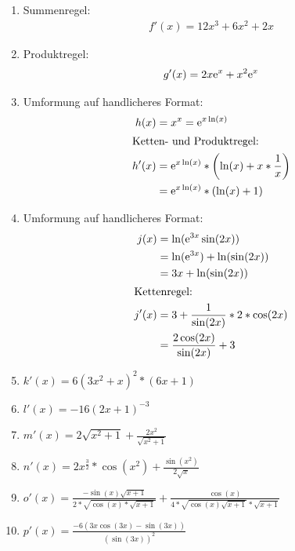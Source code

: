 \begin{lsg}{}
	\begin{multicols}{2}
		\begin{enumerate}
			\item Summenregel: \begin{align*}
			f'(x)=12x^3+6x^2+2x
			\end{align*}
			\item Produktregel: \begin{align*}
			g'(x)=2x\mathrm{e}^x+x^2\mathrm{e}^x
			\end{align*}
			\item Umformung auf handlicheres Format: \begin{align*}
		    h(x)&= x^x= \mathrm{e}^{x\ln(x)}\\
		    \intertext{Ketten- und Produktregel: }
				h'(x)&=\mathrm{e}^{x\ln(x)}* \left(\ln(x)+x*\frac{1}{x}\right) \\
				&= \mathrm{e}^{x\ln(x)}*(\ln(x)+1)
		  \end{align*}
		  \item Umformung auf handlicheres Format: \begin{align*}
		    j(x)&= \ln(\mathrm{e}^{3x}\sin(2x))\\
				&= \ln(\mathrm{e}^{3x}) + \ln(\sin(2x)) \\
				&= 3x + \ln(\sin(2x))\\
				\intertext{Kettenregel:}
		    j'(x)&=3+\frac{1}{\sin(2x)} * 2*\cos(2x) \\
				&= \frac{2\cos(2x)}{\sin(2x)}+3
		  \end{align*}
			\item $k'(x) = 6(3x^2+x)^2*(6x+1)$
	    \item $l'(x) = -16(2x+1)^{-3}$
	    \item $m'(x) = 2\sqrt{x^2+1}+\frac{2x^2}{\sqrt{x^2+1}}$
	    \item $n'(x) = 2x^{\frac 3 2}*\cos(x^2)+\frac{\sin(x^2)}{2\sqrt x}$
	    \item $o'(x) = \frac{-\sin(x)\sqrt{x+1}}{2*\sqrt{\cos(x)*\sqrt{x+1}}}+\frac{\cos(x)}{4*\sqrt{\cos(x)\sqrt{x+1}}*\sqrt{x+1}}$
	    \item $p'(x) = \frac{-6\left(3x\cos(3x)-\sin(3x)\right)}{\left(\sin(3x)\right)^2}$
		\end{enumerate}
	\end{multicols}
\end{lsg}



